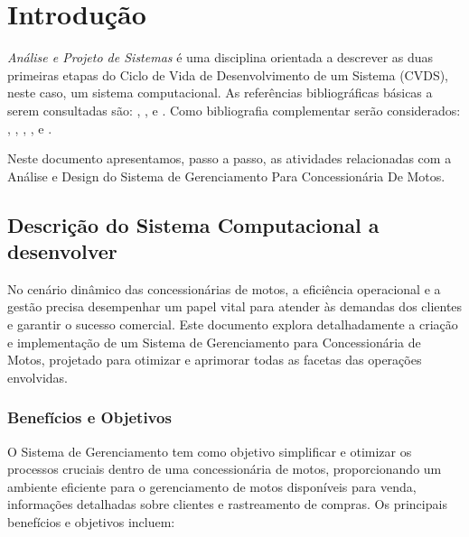 

\chapter{ Introdu\c{c}\~{a}o}

\textit{An\'{a}lise e Projeto de Sistemas} \'{e} uma disciplina orientada a descrever as duas primeiras etapas do Ciclo de Vida de Desenvolvimento de um Sistema (CVDS), neste caso, um sistema computacional.  As refer\^{e}ncias bibliogr\'{a}ficas b\'{a}sicas a serem consultadas s\~{a}o: \cite{Dennis2014}, \cite{Dennis2019},\cite{Gane1983} e \cite{Sommerville2011}. Como bibliografia complementar ser\~{a}o considerados: \cite{Satzinger2012}, \cite{Shelly2012}, \cite{Valacich2020}, \cite{Kendall2020}, \cite{Budgen2021} e \cite{Engholm2013}.

Neste documento apresentamos, passo a passo,  as atividades relacionadas com a An\'{a}lise e Design do Sistema de Gerenciamento Para Concessionária De Motos.


 \section{Descri\c{c}\~{a}o do Sistema Computacional a desenvolver}

No cenário dinâmico das concessionárias de motos, a eficiência operacional e a gestão precisa desempenhar um papel vital para atender às demandas dos clientes e garantir o sucesso comercial. Este documento explora detalhadamente a criação e implementação de um Sistema de Gerenciamento para Concessionária de Motos, projetado para otimizar e aprimorar todas as facetas das operações envolvidas.

        \subsection{Benefícios e Objetivos} 
		O Sistema de Gerenciamento tem como objetivo simplificar e otimizar os processos cruciais dentro de uma concessionária de motos, proporcionando um ambiente eficiente para o gerenciamento de motos disponíveis para venda, informações detalhadas sobre clientes e rastreamento de compras. Os principais benefícios e objetivos incluem:
		
